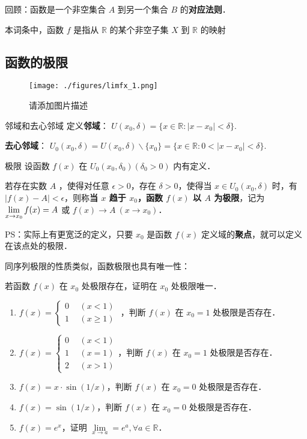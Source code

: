 

回顾：函数是一个非空集合 $A$ 到另一个集合 $B$ 的\textbf{对应法则}．

本词条中，函数 $f$ 是指从 $\mathbb R$ 的某个非空子集 $X$ 到 $\mathbb{R}$ 的映射  

\subsection{函数的极限}
\begin{figure}[ht]
\centering
\texttt{[image: ./figures/limfx\_1.png]}
\caption{请添加图片描述} \label{limfx_fig1}
\end{figure}
\begin{definition}{邻域和去心邻域}
  定义\textbf{邻域}： $U(x_0,\delta)=\{x\in \mathbb{R}:|x-x_0|<\delta\}$.

  \textbf{去心邻域}： $U_0(x_0,\delta)= U(x_0,\delta) \backslash \{x_0\}=\{x\in \mathbb{R}:0<|x-x_0|<\delta\}$.
\end{definition}
\begin{definition}{极限}
 设函数 $f(x)$ 在 $U_0(x_0,\delta_0)(\delta_0>0)$ 内有定义．

  若存在实数 $A$ ，使得对任意 $\epsilon >0$，存在 $\delta>0$，使得当 $x\in U_0(x_0,\delta)$ 时，有 $|f(x)-A|<\epsilon$，则称\textbf{当 $x$ 趋于 $x_0$，函数 $f(x)$ 以 $A$ 为极限}，记为 $\large \lim\limits_{x\rightarrow x_0}f(x)=A$ 或 $f(x)\rightarrow A\ (x\rightarrow x_0)$．
\end{definition}
PS：实际上有更宽泛的定义，只要 $x_0$ 是函数 $f(x)$ 定义域的\textbf{聚点}，就可以定义在该点处的极限．

同序列极限的性质类似，函数极限也具有唯一性：
\begin{theorem}{}
  若函数 $f(x)$ 在 $x_0$ 处极限存在，证明在 $x_0$ 处极限唯一．
\end{theorem}
\begin{exercise}{}
\begin{enumerate}
\item  $f(x)=\left\{\begin{aligned} 0\ \ &(x<1)\\ 1\ \ &(x\ge 1) \end{aligned}\right.$ ，判断 $f(x)$ 在 $x_0=1$ 处极限是否存在．
\item $f(x)=\left\{\begin{aligned} 0\ \ &(x<1)\\ 1\ \ &(x= 1)\\2\ \ &(x>1) \end{aligned}\right.$，判断 $f(x)$ 在 $x_0=1$ 处极限是否存在．
\item $f(x)=x\cdot \sin(1/x)$，判断 $f(x)$ 在 $x_0=0$ 处极限是否存在．
\item $f(x)=\sin(1/x)$，判断 $f(x)$ 在 $x_0=0$ 处极限是否存在．
\item $f(x)=e^x$，证明 $\lim\limits_{x\rightarrow a}=e^a,\forall a\in\mathbb{R}$．
\end{enumerate}
\end{exercise}


